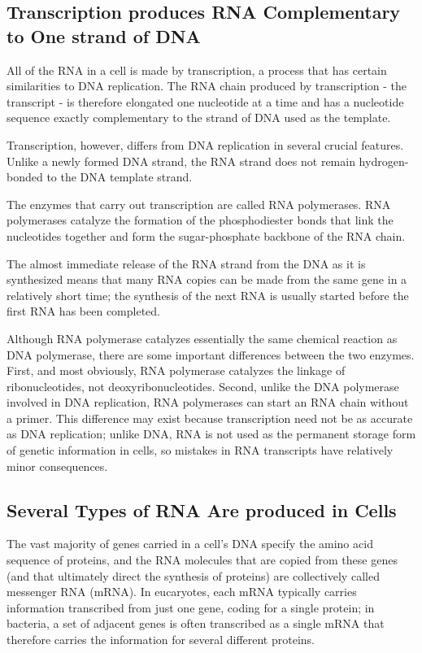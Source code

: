\subsection{Transcription produces RNA Complementary to One strand of DNA}

All of the RNA in a cell is made by transcription, a process that has certain
similarities to DNA replication.
The RNA chain produced by transcription - the transcript - is therefore
elongated one nucleotide at a time and has a nucleotide sequence exactly
complementary to the strand of DNA used as the template.

Transcription, however, differs from DNA replication in several crucial
features. Unlike a newly formed DNA strand, the RNA strand does not
remain hydrogen-bonded to the DNA template strand.

The enzymes that carry out transcription are called RNA polymerases.
RNA polymerases catalyze the formation of the phosphodiester bonds that
link the nucleotides together and form the sugar-phosphate
backbone of the RNA chain.

The almost immediate release of the RNA strand from the DNA as it is
synthesized means that many RNA copies can be made from the same
gene in a relatively short time; the synthesis of the next RNA is usually
started before the first RNA has been completed.

Although RNA polymerase catalyzes essentially the same chemical reaction
as DNA polymerase, there are some important differences between
the two enzymes. First, and most obviously, RNA polymerase catalyzes
the linkage of ribonucleotides, not deoxyribonucleotides. Second, unlike
the DNA polymerase involved in DNA replication, RNA polymerases can
start an RNA chain without a primer. This difference may exist because
transcription need not be as accurate as DNA replication; unlike DNA,
RNA is not used as the permanent storage form of genetic information in
cells, so mistakes in RNA transcripts have relatively minor consequences.

\subsection{Several Types of RNA Are produced in Cells}

The vast majority of genes carried in a cell’s DNA specify the amino
acid sequence of proteins, and the RNA molecules that are copied from
these genes (and that ultimately direct the synthesis of proteins) are collectively
called messenger RNA (mRNA). In eucaryotes, each mRNA
typically carries information transcribed from just one gene, coding for a
single protein; in bacteria, a set of adjacent genes is often transcribed as
a single mRNA that therefore carries the information for several different
proteins.

